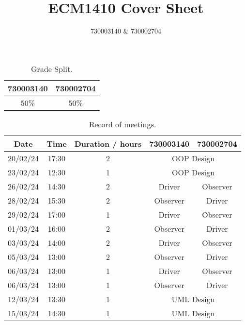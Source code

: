 \documentclass{article}
\title{ECM1410 Cover Sheet}
\author{730003140 \& 730002704}
\begin{document}
\maketitle

\begin{table}[h]
    \centering
    \begin{tabular}{cc}
        \toprule
        \textbf{730003140} & \textbf{730002704} \\
        \midrule
        50\%               & 50\%               \\
        \bottomrule
    \end{tabular}
    \caption{Grade Split.}
\end{table}

\begin{table}[h]
    \centering
    \begin{tabular}{ccccc}
        \toprule
        \textbf{Date} & \textbf{Time} & \textbf{Duration / hours} & \textbf{730003140}             & \textbf{730002704} \\
        \midrule
        20/02/24      & 17:30         & 2                         & \multicolumn{2}{c}{OOP Design}                      \\
        23/02/24      & 12:30         & 1                         & \multicolumn{2}{c}{OOP Design}                      \\
        26/02/24      & 14:30         & 2                         & Driver                         & Observer           \\
        28/02/24      & 15:30         & 2                         & Observer                       & Driver             \\
        29/02/24      & 17:00         & 1                         & Driver                         & Observer           \\
        01/03/24      & 16:00         & 2                         & Observer                       & Driver             \\
        03/03/24      & 14:00         & 2                         & Driver                         & Observer           \\
        05/03/24      & 13:00         & 2                         & Observer                       & Driver             \\
        06/03/24      & 13:00         & 1                         & Driver                         & Observer           \\
        06/03/24      & 13:00         & 1                         & Observer                       & Driver             \\
        12/03/24      & 13:30         & 1                         & \multicolumn{2}{c}{UML Design}                      \\
        15/03/24      & 14:30         & 1                         & \multicolumn{2}{c}{UML Design}                      \\
        \bottomrule
    \end{tabular}
    \caption{Record of meetings.}
\end{table}
\end{document}
